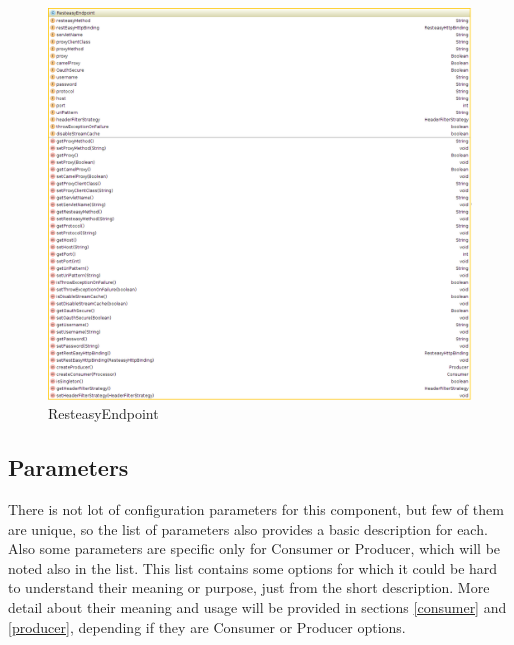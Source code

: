 \documentclass[12pt,final,oneside]{fithesis2}
\begin{document}
\begin{figure}
\centering
\includegraphics[width=0.9\linewidth]{images/endpoint.png}
\caption{ResteasyEndpoint}
\label{endpoint}
\end{figure}

\subsection{Parameters}
There is not lot of configuration parameters for this component, but few of them are unique, so the list of parameters also provides a basic description for each. Also some parameters are specific only for Consumer or Producer, which will be noted also in the list. This list contains some options for which it could be hard to understand their meaning or purpose, just from the short description. More detail about their meaning and usage will be provided in sections \ref{consumer} and \ref{producer}, depending if they are Consumer or Producer options.  
\end{document}
